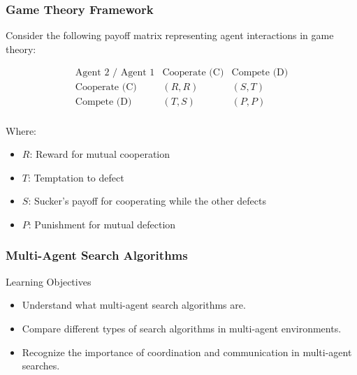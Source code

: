 \documentclass[aspectratio=169]{beamer}
\begin{document}
\begin{frame}[fragile]
    \frametitle{Game Theory Framework}
    Consider the following payoff matrix representing agent interactions in game theory:

    \begin{equation}
        \begin{array}{c|c|c}
            \text{Agent 2 / Agent 1} & \text{Cooperate (C)} & \text{Compete (D)} \\
            \hline
            \text{Cooperate (C)} & (R, R) & (S, T) \\
            \text{Compete (D)} & (T, S) & (P, P) \\
        \end{array}
    \end{equation}

    Where:
    \begin{itemize}
        \item $R$: Reward for mutual cooperation
        \item $T$: Temptation to defect
        \item $S$: Sucker's payoff for cooperating while the other defects
        \item $P$: Punishment for mutual defection
    \end{itemize}
\end{frame}

\begin{frame}[fragile]
    \frametitle{Multi-Agent Search Algorithms}
    \begin{block}{Learning Objectives}
        \begin{itemize}
            \item Understand what multi-agent search algorithms are.
            \item Compare different types of search algorithms in multi-agent environments.
            \item Recognize the importance of coordination and communication in multi-agent searches.
        \end{itemize}
    \end{block}
\end{frame}
\end{document}
